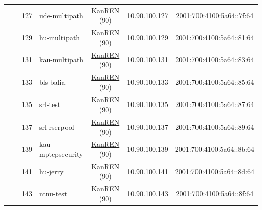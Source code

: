 \begin{small}
\begin{center}
\begin{longtable}{|c|c|c|c|c|c|c|c|}
  &  & \tiny{127} & \multicolumn{1}{|l|}{\tiny{ude-multipath}} & \multicolumn{2}{|c|}{\tiny{\href{http://www.kanren.net}{KanREN} (90)}} & \tiny{10.90.100.127} & \tiny{2001:700:4100:5a64::7f:64} \\* \cline{3-3}\cline{4-4}\cline{5-5}\cline{6-6}\cline{7-7}\cline{8-8}
  &  & \tiny{129} & \multicolumn{1}{|l|}{\tiny{hu-multipath}} & \multicolumn{2}{|c|}{\tiny{\href{http://www.kanren.net}{KanREN} (90)}} & \tiny{10.90.100.129} & \tiny{2001:700:4100:5a64::81:64} \\* \cline{3-3}\cline{4-4}\cline{5-5}\cline{6-6}\cline{7-7}\cline{8-8}
  &  & \tiny{131} & \multicolumn{1}{|l|}{\tiny{kau-multipath}} & \multicolumn{2}{|c|}{\tiny{\href{http://www.kanren.net}{KanREN} (90)}} & \tiny{10.90.100.131} & \tiny{2001:700:4100:5a64::83:64} \\* \cline{3-3}\cline{4-4}\cline{5-5}\cline{6-6}\cline{7-7}\cline{8-8}
  &  & \tiny{133} & \multicolumn{1}{|l|}{\tiny{bls-balia}} & \multicolumn{2}{|c|}{\tiny{\href{http://www.kanren.net}{KanREN} (90)}} & \tiny{10.90.100.133} & \tiny{2001:700:4100:5a64::85:64} \\* \cline{3-3}\cline{4-4}\cline{5-5}\cline{6-6}\cline{7-7}\cline{8-8}
  &  & \tiny{135} & \multicolumn{1}{|l|}{\tiny{srl-test}} & \multicolumn{2}{|c|}{\tiny{\href{http://www.kanren.net}{KanREN} (90)}} & \tiny{10.90.100.135} & \tiny{2001:700:4100:5a64::87:64} \\* \cline{3-3}\cline{4-4}\cline{5-5}\cline{6-6}\cline{7-7}\cline{8-8}
  &  & \tiny{137} & \multicolumn{1}{|l|}{\tiny{srl-rserpool}} & \multicolumn{2}{|c|}{\tiny{\href{http://www.kanren.net}{KanREN} (90)}} & \tiny{10.90.100.137} & \tiny{2001:700:4100:5a64::89:64} \\* \cline{3-3}\cline{4-4}\cline{5-5}\cline{6-6}\cline{7-7}\cline{8-8}
  &  & \tiny{139} & \multicolumn{1}{|l|}{\tiny{kau-mptcpsecurity}} & \multicolumn{2}{|c|}{\tiny{\href{http://www.kanren.net}{KanREN} (90)}} & \tiny{10.90.100.139} & \tiny{2001:700:4100:5a64::8b:64} \\* \cline{3-3}\cline{4-4}\cline{5-5}\cline{6-6}\cline{7-7}\cline{8-8}
  &  & \tiny{141} & \multicolumn{1}{|l|}{\tiny{hu-jerry}} & \multicolumn{2}{|c|}{\tiny{\href{http://www.kanren.net}{KanREN} (90)}} & \tiny{10.90.100.141} & \tiny{2001:700:4100:5a64::8d:64} \\* \cline{3-3}\cline{4-4}\cline{5-5}\cline{6-6}\cline{7-7}\cline{8-8}
  &  & \tiny{143} & \multicolumn{1}{|l|}{\tiny{ntnu-test}} & \multicolumn{2}{|c|}{\tiny{\href{http://www.kanren.net}{KanREN} (90)}} & \tiny{10.90.100.143} & \tiny{2001:700:4100:5a64::8f:64} \\ \hline

\end{longtable}
\end{center}
\end{small}

